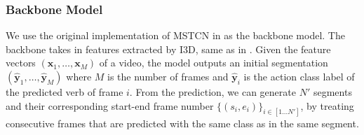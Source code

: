 

\subsubsection{Backbone Model}
We use the original implementation of MSTCN in  as the backbone model. The backbone takes in features extracted by I3D, same as in . Given the feature vectors $(\mathbf{x}_1,\dots,\mathbf{x}_M)$ of a video, the model outputs an initial segmentation $(\hat{\mathbf{y}}_1,\dots,\hat{\mathbf{y}}_M)$ where $M$ is the number of frames and $\hat{\mathbf{y}}_i$ is the action class label of the predicted verb of frame $i$. From the prediction, we can generate $N'$ segments and their corresponding start-end frame number $\{(s_i,e_i)\}_{i\in [1\dots N']}$, by treating consecutive frames that are predicted with the same class as in the same segment. 

